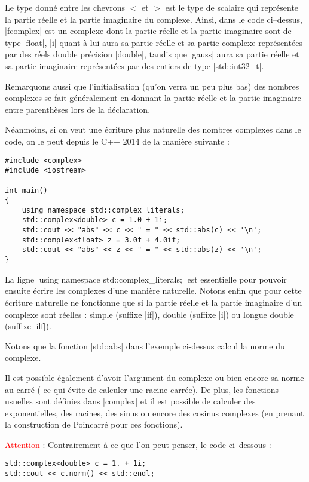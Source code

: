 Le type donné entre les chevrons $<$ et $>$ est le type de scalaire qui représente la partie réelle et la partie imaginaire du complexe. Ainsi, dans le code ci--dessus, |fcomplex| est un complexe dont la partie réelle et la partie imaginaire sont de type |float|, |i| quant-à lui aura sa partie réelle et sa partie complexe représentées par 
des réels double précision |double|, tandis que |gauss| aura sa partie réelle et sa partie imaginaire représentées
par des entiers de type |std::int32_t|.

Remarquons aussi que l'initialisation (qu'on verra un peu plus bas) des nombres complexes se fait généralement en donnant la partie réelle et la partie imaginaire entre parenthèses lors de la déclaration.

Néanmoins, si on veut une écriture plus naturelle des nombres complexes dans le code, on le peut depuis le C++ 2014 de
la manière suivante :

\begin{lstlisting}[caption=Exemple de déclaration des complexes à l'aide de littéraux]
#include <complex>
#include <iostream>

int main()
{
    using namespace std::complex_literals;
    std::complex<double> c = 1.0 + 1i;
    std::cout << "abs" << c << " = " << std::abs(c) << '\n';
    std::complex<float> z = 3.0f + 4.0if;
    std::cout << "abs" << z << " = " << std::abs(z) << '\n';
}
\end{lstlisting}

La ligne |using namespace std::complex_literals;| est essentielle pour pouvoir ensuite écrire les complexes d'une manière naturelle. Notons enfin que pour cette écriture naturelle ne fonctionne que si la partie réelle et la partie imaginaire d'un complexe sont réelles : simple (suffixe |if|), double (suffixe |i|) ou longue double (suffixe |ilf|).

Notons que la fonction |std::abs| dans l'exemple ci-dessus calcul la norme du complexe.

Il est possible également d'avoir l'argument du complexe ou bien encore sa norme au carré ( ce qui évite de calculer une racine carrée). De plus, les fonctions usuelles sont définies dans |complex| et il est possible de calculer des exponentielles, des racines, des sinus ou encore des cosinus complexes (en prenant la construction de Poincarré pour ces fonctions). 

\textcolor{red}{Attention} : Contrairement à ce que l'on peut penser, le code ci--dessous :
\begin{lstlisting}
std::complex<double> c = 1. + 1i;
std::cout << c.norm() << std::endl;
\end{lstlisting}

